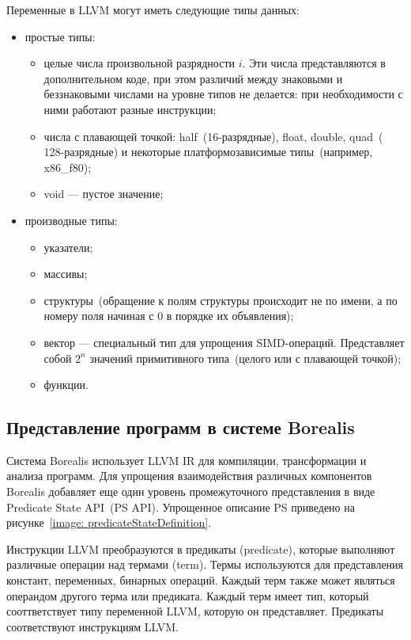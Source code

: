 Переменные в LLVM могут иметь следующие типы данных:
\begin{itemize}
\item простые типы:
    \begin{itemize}
    \item целые числа произвольной разрядности $i$. Эти числа представляются в 
    дополнительном коде, при этом различий между знаковыми и беззнаковыми 
    числами на уровне типов не делается: при необходимости с ними работают 
    разные инструкции;
    \item числа с плавающей точкой: half~(16-разрядные), float, double, quad~(
    128-разрядные) и некоторые платформозависимые типы~(например, x86\_f80);
    \item void --- пустое значение;
    \end{itemize}

\item производные типы:
    \begin{itemize}
    \item указатели;
    \item массивы;
    \item структуры~(обращение к полям структуры происходит не по имени, а по 
    номеру поля начиная с 0 в порядке их объявления);
    \item вектор --- специальный тип для упрощения SIMD-операций. Представляет 
    собой $2^n$ значений примитивного типа~(целого или с плавающей точкой);
    \item функции.
    \end{itemize}
\end{itemize}

\subsection{Представление программ в системе Borealis}
Система Borealis использует LLVM IR для компиляции, трансформации и анализа 
программ. Для упрощения взаимодействия различных компонентов Borealis 
добавляет еще один уровень промежуточного представления в виде Predicate State 
API~(PS API). Упрощенное описание PS приведено на рисунке~\ref{image:
predicateStateDefinition}.

Инструкции LLVM преобразуются в предикаты (predicate), которые выполняют 
различные операции над термами (term). Термы используются для представления 
констант, переменных, бинарных операций. Каждый терм также может являться 
операндом другого терма или предиката. Каждый терм имеет тип, который 
сооттветствует типу переменной LLVM, которую он представляет. Предикаты 
соответствуют инструкциям LLVM.
    
